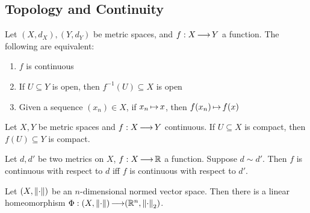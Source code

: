 \subsection{Topology and Continuity}

\begin{thm}
    Let $ (X, d_{X}), (Y, d_{Y}) $ be metric spaces, and $ f:X \operatorname{\longrightarrow} Y $ a
    function. The following are equivalent:
    \begin{enumerate}
        \item $ f $ is continuous
        \item If $ U \subseteq Y $ is open, then $ f^{-1}(U) \subseteq X $
            is open
        \item Given a sequence $ (x_{n}) \in X $, if $ x_{n} \operatorname{\mapsto} x $, then
            $ f(x_{n}) \operatorname{\mapsto} f(x) $
    \end{enumerate}
\end{thm}

\begin{thm}
    Let $ X, Y $ be metric spaces and $ f:X \operatorname{\longrightarrow} Y $ continuous.
    If $ U \subseteq X $ is compact, then $ f(U) \subseteq Y $ is compact.
\end{thm}

\begin{thm}
    Let $ d, d' $ be two metrics on $ X $, $ f: X \operatorname{\longrightarrow} \mathbb{R} $ a function.
    Suppose $ d \sim d' $. Then $ f $ is continuous with respect to $ d $ iff
    $ f $ is continuous with respect to $ d' $.
\end{thm}

\begin{thm}
    Let $ (X, \left\|\cdot\right\|) $ be an $ n $-dimensional normed vector space.
    Then there is a linear homeomorphism $ \Phi: (X, \left\|\cdot\right\|) \operatorname{\longrightarrow}
    (\mathbb{R}^{n}, \left\|\cdot\right\|_{2}) $.
\end{thm}

